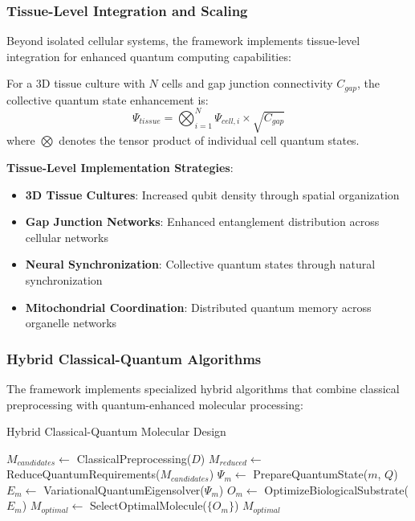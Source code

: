 \documentclass[11pt,a4paper]{article}
\begin{document}
\subsubsection{Tissue-Level Integration and Scaling}

Beyond isolated cellular systems, the framework implements tissue-level integration for enhanced quantum computing capabilities:

\begin{theorem}
For a 3D tissue culture with $N$ cells and gap junction connectivity $C_{gap}$, the collective quantum state enhancement is:
\begin{equation}
\Psi_{tissue} = \bigotimes_{i=1}^{N} \Psi_{cell,i} \times \sqrt{C_{gap}}
\end{equation}
where $\bigotimes$ denotes the tensor product of individual cell quantum states.
\end{theorem}

\textbf{Tissue-Level Implementation Strategies}:
\begin{itemize}
\item \textbf{3D Tissue Cultures}: Increased qubit density through spatial organization
\item \textbf{Gap Junction Networks}: Enhanced entanglement distribution across cellular networks
\item \textbf{Neural Synchronization}: Collective quantum states through natural synchronization
\item \textbf{Mitochondrial Coordination}: Distributed quantum memory across organelle networks
\end{itemize}

\subsubsection{Hybrid Classical-Quantum Algorithms}

The framework implements specialized hybrid algorithms that combine classical preprocessing with quantum-enhanced molecular processing:

\begin{algorithm}
\caption{Hybrid Classical-Quantum Molecular Design}
\begin{algorithmic}
    \State $M_{candidates} \leftarrow$ ClassicalPreprocessing($D$)
    \State $M_{reduced} \leftarrow$ ReduceQuantumRequirements($M_{candidates}$)
        \State $\Psi_m \leftarrow$ PrepareQuantumState($m$, $Q$)
        \State $E_m \leftarrow$ VariationalQuantumEigensolver($\Psi_m$)
        \State $O_m \leftarrow$ OptimizeBiologicalSubstrate($E_m$)
    \EndFor
    \State $M_{optimal} \leftarrow$ SelectOptimalMolecule($\{O_m\}$)
    \State \Return $M_{optimal}$
\EndProcedure
\end{algorithmic}
\end{algorithm}
\end{document}

